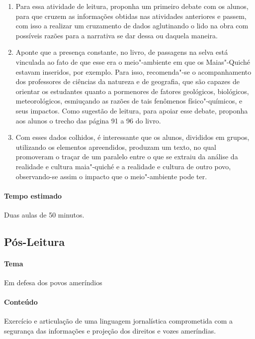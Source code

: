 \documentclass[12pt]{extarticle}
\begin{document}
\begin{enumerate}
\item
Para essa atividade de leitura, proponha um primeiro debate com os alunos, 
para que cruzem as informações obtidas nas atividades anteriores e passem, 
com isso a realizar um cruzamento de dados aglutinando o lido na obra
com possíveis razões para a narrativa se dar dessa ou daquela maneira.

\item
Aponte que a presença constante, no livro, de passagens na selva está vinculada ao fato de que esse era 
o meio"-ambiente em que os Maias"-Quiché estavam inseridos, por exemplo.
Para isso, recomenda"-se o acompanhamento dos professores de ciências da
natureza e de geografia, que são capazes de orientar os estudantes
quanto a pormenores de fatores geológicos, biológicos, meteorológicos,
esmiuçando as razões de tais fenômenos físico"-químicos, e seus impactos.
Como sugestão de leitura, para apoiar esse debate, proponha aos alunos o trecho das página 91 a 96 do livro.

\item
Com esses dados colhidos, é interessante que os alunos, divididos em
grupos, utilizando os elementos apreendidos, produzam um texto, no qual
promoveram o traçar de um paralelo entre o que se extraiu da análise da
realidade e cultura maia"-quiché e a realidade e cultura de outro povo,
observando-se assim o impacto que o meio"-ambiente pode ter.

\end{enumerate}

\paragraph{Tempo estimado} Duas aulas de 50 minutos. 

\subsection{Pós-Leitura}

\paragraph{Tema} Em defesa dos povos ameríndios

\paragraph{Conteúdo}  Exercício e articulação de uma linguagem jornalística
comprometida com a segurança das informações e projeção dos direitos e vozes
ameríndias. 
\end{document}
